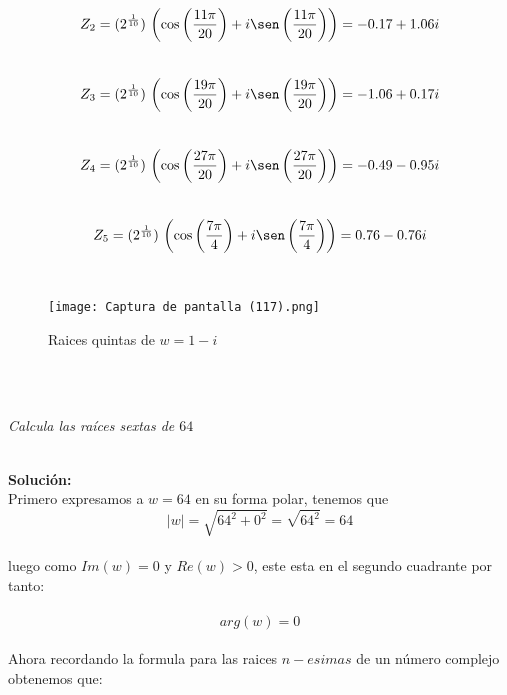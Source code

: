 \documentclass[11pt,letterpaper]{article}
\begin{document}
    \,\\
    \begin{equation*}
        Z_2=(2^{\frac{1}{10}})\,\left(\cos\left(\frac{11\pi}{20}\right)+i\sen\left(\frac{11\pi}{20}\right)\right)=-0.17+1.06i
    \end{equation*}
\,\\
    \begin{equation*}
        Z_3=(2^{\frac{1}{10}})\,\left(\cos\left(\frac{19\pi}{20}\right)+i\sen\left(\frac{19\pi}{20}\right)\right)=-1.06+0.17i
    \end{equation*}
    \,\\
    \begin{equation*}
        Z_4=(2^{\frac{1}{10}})\,\left(\cos\left(\frac{27\pi}{20}\right)+i\sen\left(\frac{27\pi}{20}\right)\right)=-0.49-0.95i
    \end{equation*}
    \,\\
    \begin{equation*}
        Z_5=(2^{\frac{1}{10}})\,\left(\cos\left(\frac{7\pi}{4}\right)+i\sen\left(\frac{7\pi}{4}\right)\right)=0.76-0.76i
    \end{equation*}
    \,\\
    \begin{figure}[htb]
    \centering
    \texttt{[image: Captura de pantalla (117).png]}
    \caption{Raices quintas de $w=1-i$}
    \label{Cono rebanado}
\end{figure}
\,\\
\newpage
\,\\
\begin{tcolorbox}[
	title = \textcolor{black}{\textcolor{white}{Problema 7}},]
\textit{Calcula las ra\'ices sextas de $64$
}
\end{tcolorbox}\,\\
\textbf{Soluci\'on:}
    \,\\
    Primero expresamos a $w=64$ en su forma polar, tenemos que\,\\
    \begin{equation*}
        |w|=\sqrt{64^2+0^2}=\sqrt{64^2}=64
    \end{equation*}\,\\
    luego como $Im(w)=0$ y $Re(w)>0$, este esta en el segundo cuadrante por tanto:\,\\
    \,\\
    \begin{equation*}
        arg(w)=0
    \end{equation*}\,\\
    Ahora recordando la formula para las raices $n-esimas$ de un n\'umero complejo obtenemos que:\,\\
\end{document}

